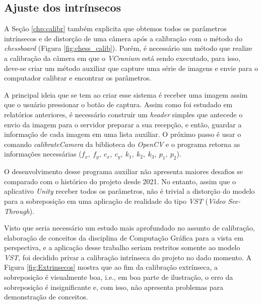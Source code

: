 \subsection{Ajuste dos intrínsecos}

A Seção \ref{chp:calibr} também explicita que obtemos todos os parâmetros intrínsecos e de distorção de uma câmera após a calibração com o método do \textit{chessboard} (Figura \ref{fig:chess_calib}). Porém, é necessário um método que realize a calibração da câmera em que o \textit{VCranium} está sendo executado, para isso, deve-se criar um método auxiliar que capture uma série de imagens e envie para o computador calibrar e encontrar os parâmetros.

A principal ideia que se tem ao criar esse sistema é receber uma imagem assim que o usuário pressionar o botão de captura. Assim como foi estudado em relatórios anteriores, é necessário construir um \textit{header} simples que antecede o envio da imagem para o servidor preparar a sua recepção, e então, guardar a informação de cada imagem em uma lista auxiliar. O próximo passo é usar o comando \textit{calibrateCamera} da biblioteca do \textit{OpenCV} e o programa retorna as informações necessárias (\(f_x, \ f_y, \ c_x, \ c_y, \ k_1, \ k_2, \ k_3, \ p_1, \ p_2\)).

O desenvolvimento desse programa auxiliar não apresenta maiores desafios se comparado com o histórico do projeto desde 2021. No entanto, assim que o aplicativo \textit{Unity} receber todos os parâmetros, não é trivial a distorção do modelo para a sobreposição em uma aplicação de realidade do tipo \textit{VST} (\textit{Video See-Through}).

Visto que seria necessário um estudo mais aprofundado no assunto de calibração, elaboração de conceitos da disciplina de Computação Gráfica para a vista em perspectiva, e a aplicação desse trabalho seriam restritos somente ao modelo \textit{VST}, foi decidido privar a calibração intrínseca do projeto no dado momento. A Figura \ref{fig:Extrinsecos} mostra que ao fim da calibração extrínseca, a sobreposição é visualmente boa, i.e., em boa parte de ilustração, o erro da sobreposição é insignificante e, com isso, não apresenta problemas para demonstração de conceitos.